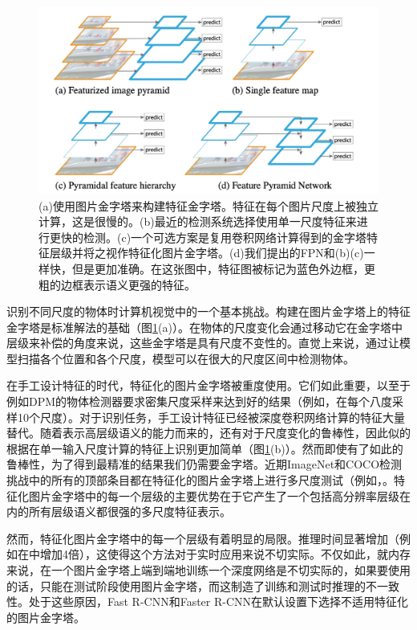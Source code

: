 \documentclass[../main.tex]{subfile}
\begin{document}
\begin{figure}[bh]
    \centering
    \includegraphics[width=.8\textwidth]{../images/img1.jpg}
    \caption{(a)使用图片金字塔来构建特征金字塔。特征在每个图片尺度上被独立计算，这是很慢的。(b)最近的检测系统选择使用单一尺度特征来进行更快的检测。(c)一个可选方案是复用卷积网络计算得到的金字塔特征层级并将之视作特征化图片金字塔。(d)我们提出的FPN和(b)(c)一样快，但是更加准确。在这张图中，特征图被标记为蓝色外边框，更粗的边框表示语义更强的特征。}
    \label{fig:img1}
\end{figure}


识别不同尺度的物体时计算机视觉中的一个基本挑战。构建在图片金字塔上的特征金字塔是标准解法的基础\cite{pyramid}（图\ref{fig:img1}(a)）。在物体的尺度变化会通过移动它在金字塔中层级来补偿的角度来说，这些金字塔是具有尺度不变性的。直觉上来说，通过让模型扫描各个位置和各个尺度，模型可以在很大的尺度区间中检测物体。

在手工设计特征的时代，特征化的图片金字塔被重度使用。它们如此重要，以至于例如DPM的物体检测器要求密集尺度采样来达到好的结果（例如，在每个八度采样10个尺度）。对于识别任务，手工设计特征已经被深度卷积网络计算的特征大量替代。随着表示高层级语义的能力而来的，还有对于尺度变化的鲁棒性，因此似的根据在单一输入尺度计算的特征上识别更加简单（图\ref{fig:img1}(b)）。然而即使有了如此的鲁棒性，为了得到最精准的结果我们仍需要金字塔。近期ImageNet和COCO检测挑战中的所有的顶部条目都在特征化的图片金字塔上进行多尺度测试（例如，\cite{16,35}。特征化图片金字塔中的每一个层级的主要优势在于它产生了一个包括高分辨率层级在内的所有层级语义都很强的多尺度特征表示。

然而，特征化图片金字塔中的每一个层级有着明显的局限。推理时间显著增加（例如在\cite{4}中增加4倍），这使得这个方法对于实时应用来说不切实际。不仅如此，就内存来说，在一个图片金字塔上端到端地训练一个深度网络是不切实际的，如果要使用的话，只能在测试阶段使用图片金字塔，而这制造了训练和测试时推理的不一致性。处于这些原因，Fast R-CNN和Faster R-CNN在默认设置下选择不适用特征化的图片金字塔。
\end{document}
